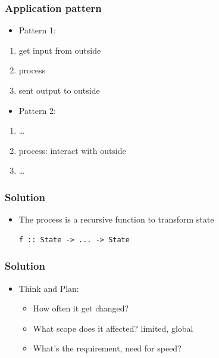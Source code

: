 \begin{frame}\frametitle{Application pattern}

\begin{itemize}
\item
  Pattern 1:
\end{itemize}

\begin{enumerate}[1.]
\item
  get input from outside
\item
  process
\item
  sent output to outside
\end{enumerate}

\begin{itemize}
\item
  Pattern 2:
\end{itemize}

\begin{enumerate}[1.]
\item
  \ldots{}
\item
  process: interact with outside
\item
  \ldots{}
\end{enumerate}

\end{frame}

\begin{frame}[fragile]\frametitle{Solution}

\begin{itemize}
\item
  The process is a recursive function to transform state

\begin{verbatim}
f :: State -> ... -> State
\end{verbatim}
\end{itemize}

\end{frame}

\begin{frame}\frametitle{Solution}

\begin{itemize}
\item
  Think and Plan:

  \begin{itemize}
  \item
    How often it get changed?
  \item
    What scope does it affected? limited, global
  \item
    What's the requirement, need for speed?
  \end{itemize}
\end{itemize}

\end{frame}

